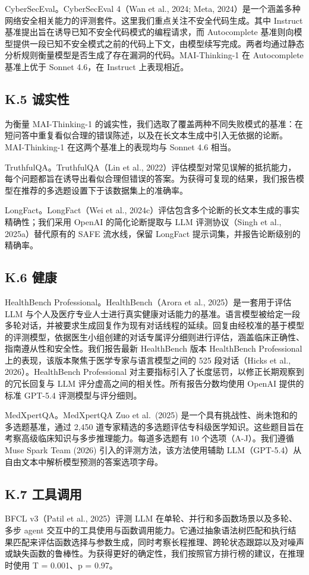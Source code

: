 CyberSecEval。CyberSecEval 4（Wan et al., 2024; Meta, 2024）是一个涵盖多种网络安全相关能力的评测套件。这里我们重点关注不安全代码生成。其中 Instruct 基准提出旨在诱导已知不安全代码模式的编程请求，而 Autocomplete 基准则向模型提供一段已知不安全模式之前的代码上下文，由模型续写完成。两者均通过静态分析规则衡量模型是否生成了存在漏洞的代码。MAI-Thinking-1 在 Autocomplete 基准上优于 Sonnet 4.6，在 Instruct 上表现相近。

\subsection{K.5 诚实性}\label{k.5-honesty}

为衡量 MAI-Thinking-1 的诚实性，我们选取了覆盖两种不同失败模式的基准：在短问答中重复看似合理的错误陈述，以及在长文本生成中引入无依据的论断。MAI-Thinking-1 在这两个基准上的表现均与 Sonnet 4.6 相当。

TruthfulQA。TruthfulQA（Lin et al., 2022）评估模型对常见误解的抵抗能力，每个问题都旨在诱导出看似合理但错误的答案。为获得可复现的结果，我们报告模型在推荐的多选题设置下于该数据集上的准确率。

LongFact。LongFact（Wei et al., 2024c）评估包含多个论断的长文本生成的事实精确性；我们采用 OpenAI 的简化论断提取与 LLM 评测协议（Singh et al., 2025a）替代原有的 SAFE 流水线，保留 LongFact 提示词集，并报告论断级别的精确率。

\subsection{K.6 健康}\label{k.6-health}

HealthBench Professional。HealthBench（Arora et al., 2025）是一套用于评估 LLM 与个人及医疗专业人士进行真实健康对话能力的基准。语言模型被给定一段多轮对话，并被要求生成回复作为现有对话线程的延续。回复由经校准的基于模型的评测模型，依据医生小组创建的对话专属评分细则进行评估，涵盖临床正确性、指南遵从性和安全性。我们报告最新 HealthBench 版本 HealthBench Professional 上的表现，该版本聚焦于医学专家与语言模型之间的 525 段对话（Hicks et al., 2026）。HealthBench Professional 对主要指标引入了长度惩罚，以修正长期观察到的冗长回复与 LLM 评分虚高之间的相关性。所有报告分数均使用 OpenAI 提供的标准 GPT-5.4 评测模型与评分细则。

MedXpertQA。MedXpertQA Zuo et al.~(2025) 是一个具有挑战性、尚未饱和的多选题基准，通过 2,450 道专家精选的多选题评估专科级医学知识。这些题目旨在考察高级临床知识与多步推理能力。每道多选题有 10 个选项（A-J）。我们遵循 Muse Spark Team (2026) 引入的评测方法，该方法使用辅助 LLM（GPT-5.4）从自由文本中解析模型预测的答案选项字母。

\subsection{K.7 工具调用}\label{k.7-tool-calling}

BFCL v3（Patil et al., 2025）评测 LLM 在单轮、并行和多函数场景以及多轮、多步 agent 交互中的工具使用与函数调用能力。它通过抽象语法树匹配和执行结果匹配来评估函数选择与参数生成，同时考察长程推理、跨轮状态跟踪以及对噪声或缺失函数的鲁棒性。为获得更好的确定性，我们按照官方排行榜的建议，在推理时使用 T = 0.001、p = 0.97。
